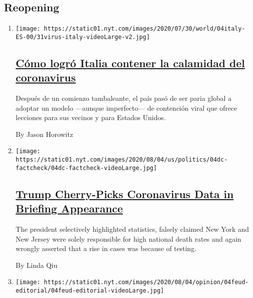 \hypertarget{reopening}{%
\subsection{Reopening}\label{reopening}}

\begin{enumerate}
\def\labelenumi{\arabic{enumi}.}
\item
  \texttt{[image: https://static01.nyt.com/images/2020/07/30/world/04italy-ES-00/31virus-italy-videoLarge-v2.jpg]}

  \hypertarget{cuxf3mo-logruxf3-italia-contener-la-calamidad-del-coronavirus}{%
  \subsection{\texorpdfstring{\href{/es/2020/08/05/espanol/mundo/italia-reapertura-coronavirus.html}{Cómo
  logró Italia contener la calamidad del
  coronavirus}}{Cómo logró Italia contener la calamidad del coronavirus}}\label{cuxf3mo-logruxf3-italia-contener-la-calamidad-del-coronavirus}}

  Después de un comienzo tambaleante, el país pasó de ser paria global a
  adoptar un modelo ---aunque imperfecto--- de contención viral que
  ofrece lecciones para sus vecinos y para Estados Unidos.

  By Jason Horowitz
\item
  \texttt{[image: https://static01.nyt.com/images/2020/08/04/us/politics/04dc-factcheck/04dc-factcheck-videoLarge.jpg]}

  \hypertarget{trump-cherry-picks-coronavirus-data-in-briefing-appearance}{%
  \subsection{\texorpdfstring{\href{/2020/08/04/us/politics/coronavirus-trump-data-briefing.html}{Trump
  Cherry-Picks Coronavirus Data in Briefing
  Appearance}}{Trump Cherry-Picks Coronavirus Data in Briefing Appearance}}\label{trump-cherry-picks-coronavirus-data-in-briefing-appearance}}

  The president selectively highlighted statistics, falsely claimed New
  York and New Jersey were solely responsible for high national death
  rates and again wrongly asserted that a rise in cases was because of
  testing.

  By Linda Qiu
\item
  \texttt{[image: https://static01.nyt.com/images/2020/08/04/opinion/04feud-editorial/04feud-editorial-videoLarge.jpg]}


\end{enumerate}
